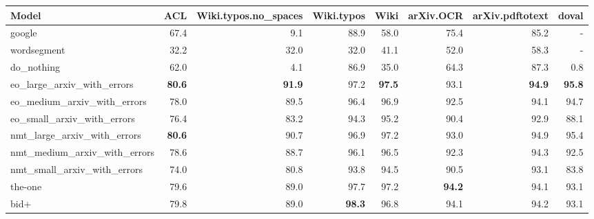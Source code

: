 \begin{tabular}{lrrrrrrr} \hline
Model & ACL & Wiki.typos.no\_spaces & Wiki.typos & Wiki & arXiv.OCR & arXiv.pdftotext & doval \\ \hline
google & 67.4 & 9.1 & 88.9 & 58.0 & 75.4 & 85.2 & - \\ 
wordsegment & 32.2 & 32.0 & 32.0 & 41.1 & 52.0 & 58.3 & - \\ 
do\_nothing & 62.0 & 4.1 & 86.9 & 35.0 & 64.3 & 87.3 & 0.8 \\ \hline
eo\_large\_arxiv\_with\_errors & \textbf{80.6} & \textbf{91.9} & 97.2 & \textbf{97.5} & 93.1 & \textbf{94.9} & \textbf{95.8} \\ 
eo\_medium\_arxiv\_with\_errors & 78.0 & 89.5 & 96.4 & 96.9 & 92.5 & 94.1 & 94.7 \\ 
eo\_small\_arxiv\_with\_errors & 76.4 & 83.2 & 94.3 & 95.2 & 90.4 & 92.9 & 88.1 \\ \hline
nmt\_large\_arxiv\_with\_errors & \textbf{80.6} & 90.7 & 96.9 & 97.2 & 93.0 & 94.9 & 95.4 \\ 
nmt\_medium\_arxiv\_with\_errors & 78.6 & 88.7 & 96.1 & 96.5 & 92.3 & 94.3 & 92.5 \\ 
nmt\_small\_arxiv\_with\_errors & 74.0 & 80.8 & 93.8 & 94.5 & 90.5 & 93.1 & 83.8 \\ \hline
the-one & 79.6 & 89.0 & 97.7 & 97.2 & \textbf{94.2} & 94.1 & 93.1 \\ 
bid+ & 79.8 & 89.0 & \textbf{98.3} & 96.8 & 94.1 & 94.2 & 93.1 \\ \hline
\end{tabular}